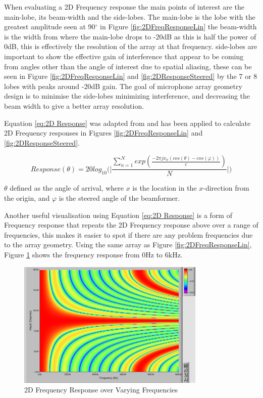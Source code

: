 \documentclass{UoNMCHA}
\numberwithin{equation}{section}
\begin{document}
    When evaluating a 2D Frequency response the main points of interest are the main-lobe, its beam-width and the side-lobes. The main-lobe is the lobe with the greatest amplitude seen at 90$^{\circ}$ in Figure \ref{fig:2DFreqResponseLin} the beam-width is the width from where the main-lobe drops to -20dB as this is half the power of 0dB, this is effectively the resolution of the array at that frequency. side-lobes are important to show the effective gain of interference that appear to be coming from angles other than the angle of interest due to spatial aliasing, these can be seen in Figure \ref{fig:2DFreqResponseLin} and \ref{fig:2DResponseSteered} by the 7 or 8 lobes with peaks around -20dB gain. The goal of microphone array geometry design is to minimise the side-lobes minimizing interference, and decreasing the beam width to give a better array resolution.
    
    Equation \ref{eq:2D Response} was adapted from \citet{Ben08} and has been applied to calculate 2D Frequency responses in Figures \ref{fig:2DFreqResponseLin} and \ref{fig:2DResponseSteered}.
    
    \begin{equation}
        Response(\theta) = 20log_{10} \Big( \Big|\frac{\sum_{n=1}^N exp(\frac{-2\pi jx_n(cos(\theta)-cos(\varphi))}{c})}{N}\Big| \Big)
        \label{eq:2D Response}
    \end{equation}
    
    $\theta$ defined as the angle of arrival, where $x$ is the location in the $x$-direction from the origin, and $\varphi$ is the steered angle of the beamformer.
    
    Another useful visualisation using Equation \ref{eq:2D Response} is a form of Frequency response that repeats the 2D Frequency response above over a range of frequencies, this makes it easier to spot if there are any problem frequencies due to the array geometry. Using the same array as Figure \ref{fig:2DFreqResponseLin}, Figure \ref{fig:2DVaryFreqResp} shows the frequency response from $0$Hz to $6$kHz.
    
    \begin{figure}[H]
        \centering
        \includegraphics[keepaspectratio, width = 0.8\textwidth]{Figures/2DVaryFreqResp.png}
        \caption{2D Frequency Response over Varying Frequencies}
        \label{fig:2DVaryFreqResp}
    \end{figure}
    
\end{document}
